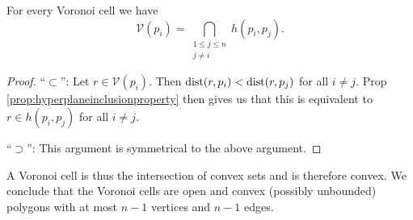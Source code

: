 \begin{cor} \label{prop:cellsareintersectionsofhalfplanes}
For every Voronoi cell we have
\[
    \mathcal{V}(p_i) = \bigcap_{\substack{1 \leq j \leq n \\ j \ne i}} h(p_i, p_j).
\]
\end{cor}
\begin{proof}
``$\subset$'': Let $r \in \mathcal{V}(p_i)$. Then $\operatorname{dist}(r, p_i) < \operatorname{dist}(r, p_j)$ for all $i \ne j$. Prop \ref{prop:hyperplaneinclusionproperty} then gives us that this is equivalent to $r \in h(p_i, p_j)$ for all $i \ne j$.

``$\supset$'': This argument is symmetrical to the above argument.
\end{proof}
A Voronoi cell is thus the intersection of convex sets and is therefore convex. We conclude that the Voronoi cells are open and convex (possibly unbounded) polygons with at most $n - 1$ vertices and $n - 1$ edges. \\

